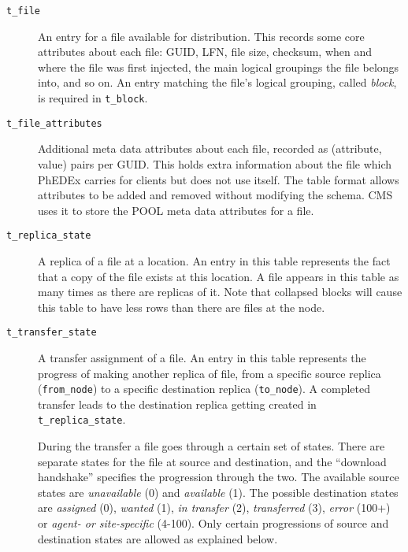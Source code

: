 \documentclass{cmspaper}
\begin{document}
\begin{description}
  \item [\texttt{t\_file}]\mbox{}

    An entry for a file available for distribution.  This records
    some core attributes about each file: GUID, LFN, file size,
    checksum, when and where the file was first injected, the
    main logical groupings the file belongs into, and so on.  An
    entry matching the file's logical grouping, called {\em block},
    is required in \texttt{t\_block}.

  \item [\texttt{t\_file\_attributes}]\mbox{}

    Additional meta data attributes about each file, recorded as
    (attribute, value) pairs per GUID.  This holds extra information
    about the file which PhEDEx carries for clients but does not use
    itself.  The table format allows attributes to be added and
    removed without modifying the schema.  CMS uses it to store the
    POOL meta data attributes for a file.

  \item [\texttt{t\_replica\_state}]\mbox{}
  
    A replica of a file at a location.  An entry in this table
    represents the fact that a copy of the file exists at this
    location.  A file appears in this table as many times as
    there are replicas of it.  Note that collapsed blocks will
    cause this table to have less rows than there are files at
    the node.

  \item [\texttt{t\_transfer\_state}]\mbox{}

    A transfer assignment of a file.  An entry in this table represents
    the progress of making another replica of file, from a specific
    source replica (\texttt{from\_node}) to a specific destination
    replica (\texttt{to\_node}).  A completed transfer leads to the
    destination replica getting created in \texttt{t\_replica\_state}.

    During the transfer a file goes through a certain set of states.
    There are separate states for the file at source and destination,
    and the ``download handshake'' specifies the progression through
    the two.  The available source states are {\em unavailable} (0)
    and {\em available} (1).  The possible destination states are
    {\em assigned} (0), {\em wanted} (1), {\em in transfer} (2),
    {\em transferred} (3), {\em error} (100+) or {\em agent- or
     site-specific} (4-100).  Only certain progressions of source
    and destination states are allowed as explained below.
    

\end{description}
\end{document}
